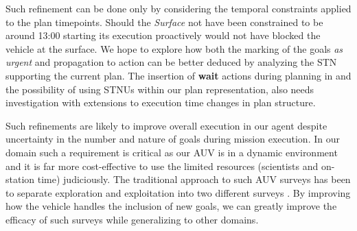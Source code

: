 Such refinement can be done only by considering the temporal
constraints applied to the plan timepoints. Should the
{\em Surface} not have been constrained to be around 13:00 starting
its execution proactively would not have blocked the vehicle at the
surface. We hope to explore how both the marking of the goals {\em as
  urgent} and propagation to action can be better deduced by analyzing
the STN supporting the current plan. The insertion of {\bf wait}
actions during planning in \cite{morris01} and the possibility of
using STNUs within our plan representation, also needs investigation
with extensions to execution time changes in plan structure.


Such refinements are likely to improve overall execution in our agent
despite uncertainty in the number and nature of goals during mission
execution. 
In our domain such a requirement is critical as our AUV is in a
dynamic environment and it is far more cost-effective to use the
limited resources (scientists and on-station time) judiciously.  The
traditional approach to such AUV surveys has been to separate
exploration and exploitation into two different surveys
\cite{Yoerger01012007}.  By improving how the vehicle handles the
inclusion of new goals, we can greatly improve the efficacy of such
surveys while generalizing to other domains.

